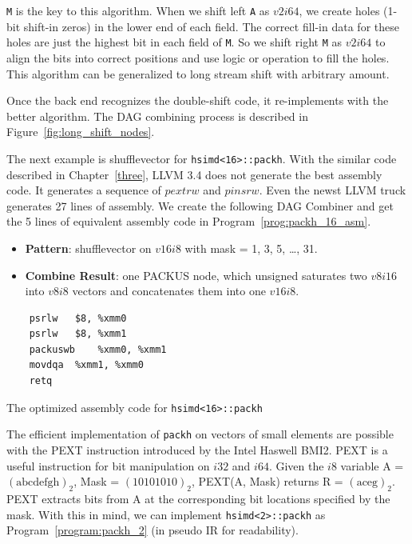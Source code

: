 {\tt M} is the key to this algorithm. When we shift left {\tt A} as $v2i64$, we create holes (1-bit shift-in zeros) in the lower end of each field. The correct fill-in data for these holes are just the highest bit in each field of {\tt M}. So we shift right {\tt M} as $v2i64$ to align the bits into correct positions and use logic or operation to fill the holes. This algorithm can be generalized to long stream shift with arbitrary amount.

Once the back end recognizes the double-shift code, it re-implements with the better algorithm. The DAG combining process is described in Figure~\ref{fig:long_shift_nodes}.

The next example is shufflevector for {\tt hsimd<16>::packh}. With the similar code described in Chapter~\ref{three}, LLVM 3.4 does not generate the best assembly code. It generates a sequence of $pextrw$ and $pinsrw$. Even the newst LLVM truck generates 27 lines of assembly. We create the following DAG Combiner and get the 5 lines of equivalent assembly code in Program~\ref{prog:packh_16_asm}.
\begin{itemize}
    \item \textbf{Pattern}: shufflevector on $v16i8$ with mask = 1, 3, 5, \ldots, 31.
    \item \textbf{Combine Result}: one PACKUS node, which unsigned saturates two $v8i16$ into $v8i8$ vectors and concatenates them into one $v16i8$.
\end{itemize}

\begin{program}[htbp!]
\begin{verbatim}
    psrlw   $8, %xmm0
    psrlw   $8, %xmm1
    packuswb    %xmm0, %xmm1
    movdqa  %xmm1, %xmm0
    retq
\end{verbatim}
\caption{The optimized assembly code for {\tt hsimd<16>::packh}}
\label{prog:packh_16_asm}
\end{program}

\FloatBarrier
The efficient implementation of {\tt packh} on vectors of small elements are possible with the PEXT instruction introduced by the Intel Haswell BMI2. PEXT is a useful instruction for bit manipulation on $i32$ and $i64$. Given the $i8$ variable A = $(\text{abcdefgh})_2$, Mask = $(10101010)_2$, PEXT(A, Mask) returns R = $(\text{aceg})_2$. PEXT extracts bits from A at the corresponding bit locations specified by the mask. With this in mind, we can implement \verb|hsimd<2>::packh| as Program~\ref{program:packh_2} (in pseudo IR for readability).


